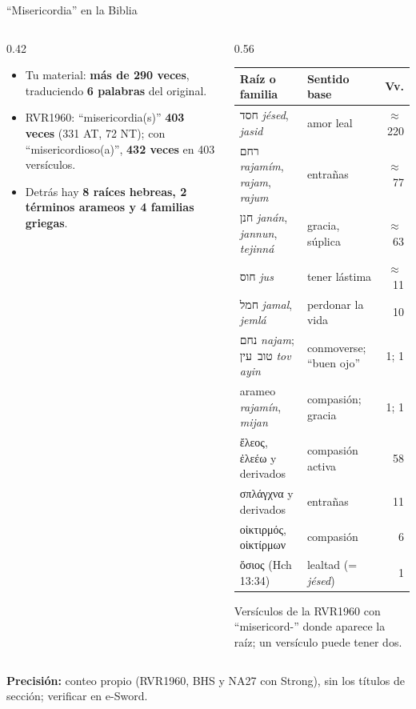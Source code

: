 \documentclass[hyperref={bookmarks=false},aspectratio=169]{beamer}
\newcommand{\heb}[1]{\mbox{\foreignlanguage{hebrew}{#1}}}
\newcommand{\grc}[1]{\foreignlanguage{ancientgreek}{#1}}
\newcommand{\destacar}[1]{\textbf{\textcolor{azul}{#1}}}
\newcommand{\precision}[1]{{\footnotesize\color{gris}\textbf{Precisión:} #1}}
\begin{document}
\begin{frame}{``Misericordia'' en la Biblia}
\begin{columns}[c,onlytextwidth]
\begin{column}{0.42\textwidth}\footnotesize
\begin{itemize}
\item Tu material: \destacar{más de 290 veces}, traduciendo \destacar{6 palabras} del original.
\item RVR1960: ``misericordia(s)'' \textbf{403 veces} (331 AT, 72 NT); con ``misericordioso(a)'', \textbf{432 veces} en 403 versículos.
\item Detrás hay \destacar{8 raíces hebreas, 2 términos arameos y 4 familias griegas}.
\end{itemize}
\end{column}
\begin{column}{0.56\textwidth}
\scriptsize\renewcommand{\arraystretch}{1.12}
\begin{tabular}{@{}>{\RaggedRight\arraybackslash}p{3.3cm}>{\RaggedRight\arraybackslash}p{2.2cm}r@{}}
\toprule
\textbf{Raíz o familia} & \textbf{Sentido base} & \textbf{Vv.} \\ \midrule
\heb{חסד} \emph{jésed}, \emph{jasid} & amor leal & $\approx$\,220 \\
\heb{רחם} \emph{rajamím}, \emph{rajam}, \emph{rajum} & entrañas & $\approx$\,77 \\
\heb{חנן} \emph{janán}, \emph{jannun}, \emph{tejinná} & gracia, súplica & $\approx$\,63 \\
\heb{חוס} \emph{jus} & tener lástima & $\approx$\,11 \\
\heb{חמל} \emph{jamal}, \emph{jemlá} & perdonar la vida & 10 \\
\heb{נחם} \emph{najam}; \heb{טוב עין} \emph{tov ayin} & conmoverse; ``buen ojo'' & 1; 1 \\
arameo \emph{rajamín}, \emph{mijan} & compasión; gracia & 1; 1 \\
\grc{ἔλεος}, \grc{ἐλεέω} y derivados & compasión activa & 58 \\
\grc{σπλάγχνα} y derivados & entrañas & 11 \\
\grc{οἰκτιρμός}, \grc{οἰκτίρμων} & compasión & 6 \\
\grc{ὅσιος} (Hch 13:34) & lealtad (= \emph{jésed}) & 1 \\
\bottomrule
\end{tabular}\par\smallskip
{\tiny\color{gris}Versículos de la RVR1960 con ``misericord-'' donde aparece la raíz; un versículo puede tener dos.}
\end{column}
\end{columns}
\precision{conteo propio (RVR1960, BHS y NA27 con Strong), sin los títulos de sección; verificar en e-Sword.}
\end{frame}
\end{document}
